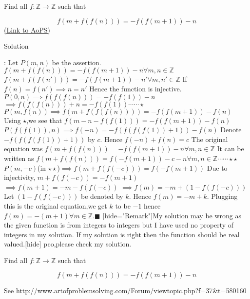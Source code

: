 \begin{problem}
	Find all $f:\mathbb{Z} \rightarrow \mathbb{Z} $ such that

\[f(m+f(f(n)))=-f(f(m+1))-n\]
	\flushright \href{https://artofproblemsolving.com/community/c6h581716}{(Link to AoPS)}
\end{problem}



\begin{solution}
	\begin{italicized}Solution\end{italicized}:
Let $P(m,n)$ be the assertion.
$f(m+f(f(n)))=-f(f(m+1))-n\forall m,n\in\mathbb{Z}$
$f(m+f(f(n')))=-f(f(m+1))-n'\forall m,n'\in\mathbb{Z}$
If $f(n)=f(n')\implies n=n'$
Hence the function is injective.
$P(0,n)\implies f(f(f(n)))=-f(f(1))-n$
$\implies f(f(f(n)))+n=-f(f(1))\cdots\cdots\star$
$P(m,f(n))\implies f(m+f(f(f(n))))=-f(f(m+1))-f(n)$
Using $\star$,we see that
$f(m-n-f(f(1)))=-f(f(m+1))-f(n)$
$P(f(f(1)),n)\implies f(-n)=-f(f(f(f(1))+1))-f(n)$
Denote $-f(f(f(f(1))+1))$ by $c$.
Hence $f(-n)+f(n)=c$
The original equation was
$f(m+f(f(n)))=-f(f(m+1))-n\forall m,n\in\mathbb{Z}$
It can be written as
$f(m+f(f(n)))=f(-f(m+1))-c-n\forall m,n\in\mathbb{Z}\cdots\cdots\star\star$
$P(m,-c)$(in $\star\star$)$\implies f(m+f(f(-c)))=f(-f(m+1))$
Due to injectivity,
$m+f(f(-c))=-f(m+1)$
$\implies f(m+1)=-m-f(f(-c))$
$\implies f(m)=-m+(1-f(f(-c)))$
Let $(1-f(f(-c)))$ be denoted by $k$.
Hence $f(m)=-m+k$.
Plugging this is the original equation,we get $k$ to be $-1$
hence $f(m)=-(m+1)\forall m\in\mathbb{Z}$.$\blacksquare$
[hide="Remark"]My solution may be wrong as the given function is from integers to integers but I have used no property of integers in my solution.
If my solution is right then the function should be real valued.[\/hide]
pco,please check my solution.
\end{solution}



\begin{solution}
	\begin{tcolorbox}Find all $f:\mathbb{Z} \rightarrow \mathbb{Z} $ such that

\[f(m+f(f(n)))=-f(f(m+1))-n\]\end{tcolorbox}
See http://www.artofproblemsolving.com/Forum/viewtopic.php?f=37&t=580160
\end{solution}




